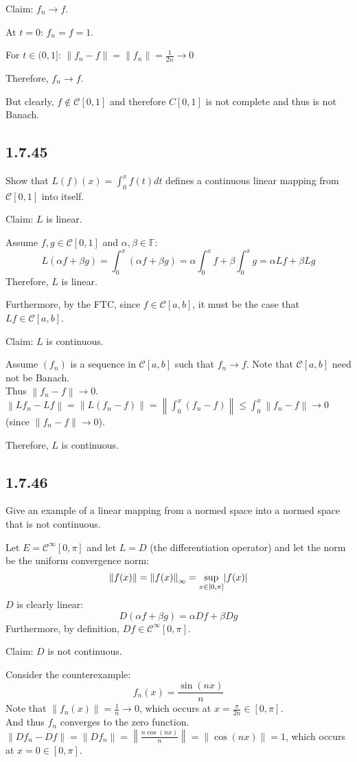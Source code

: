 \documentclass[letterpaper,12pt,fleqn]{article}
\newcommand{\mc}{\mathcal{C}}
\renewcommand{\a}{\alpha}
\renewcommand{\b}{\beta}
\newcommand{\F}{\mathbb{F}}
\newcommand{\norm}[1]{\left\|#1\right\|}
\begin{document}
Claim: $f_n\to f$.

At $t=0$: $f_n=f=1$.

For $t\in(0,1]$: $\norm{f_n-f}=\norm{f_n}=\frac{1}{2n}\to0$

Therefore, $f_n\to f$.

But clearly, $f\notin\mc[0,1]$ and therefore $C[0,1]$ is not complete and thus
is not Banach.

\subsection*{1.7.45}

Show that $L(f)(x)=\int_0^xf(t)dt$ defines a continuous linear mapping from
$\mc[0,1]$ into itself.

Claim: $L$ is linear.

Assume $f,g\in\mc[0,1]$ and $\a,\b\in\F$:
\[L(\a f+\b g)=\int_0^x(\a f+\b g)=\a\int_0^xf+\b\int_0^xg=\a Lf+\b Lg\]
Therefore, $L$ is linear.

Furthermore, by the FTC, since $f\in\mc[a,b]$, it must be the case that
$Lf\in\mc[a,b]$.

Claim: $L$ is continuous.

Assume $(f_n)$ is a sequence in $\mc[a,b]$ such that $f_n\to f$. Note that
$\mc[a,b]$ need not be Banach. \\
Thus $\norm{f_n-f}\to0$. \\
$\norm{Lf_n-Lf}=\norm{L(f_n-f)}=\norm{\int_0^x(f_n-f)}\le\int_0^x\norm{f_n-f}
\to0$ (since $\norm{f_n-f}\to0$).

Therefore, $L$ is continuous.

\subsection*{1.7.46}

Give an example of a linear mapping from a normed space into a normed space
that is not continuous.

Let $E=\mc^{\infty}[0,\pi]$ and let $L=D$ (the differentiation operator) and let
the norm be the uniform convergence norm:
\[\norm{f(x)}=\norm{f(x)}_{\infty}=\sup_{x\in[0,\pi]}\abs{f(x)}\]
$D$ is clearly linear:
\[D(\a f+\b g)=\a Df+\b Dg\]
Furthermore, by definition, $Df\in\mc^{\infty}[0,\pi]$.

Claim: $D$ is not continuous.

Consider the counterexample:
\[f_n(x)=\frac{\sin(nx)}{n}\]
Note that $\norm{f_n(x)}=\frac{1}{n}\to0$, which occurs at
$x=\frac{\pi}{2n}\in[0,\pi]$. \\
And thus $f_n$ converges to the zero function. \\
$\norm{Df_n-Df}=\norm{Df_n}=\norm{\frac{n\cos(nx)}{n}}=\norm{\cos(nx)}=1$,
which occurs at $x=0\in[0,\pi]$.
\end{document}
